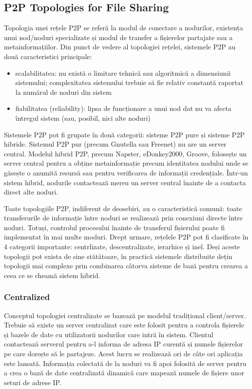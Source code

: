 \subsection{P2P Topologies for File Sharing}

Topologia unei rețele P2P se referă la modul de conectare a nodurilor,
existența unui nod/noduri specializate și modul de transfer a fișierelor
partajate sau a metainformațiilor. Din punct de vedere al topologiei rețelei,
sistemele P2P au două caracteristici principale:

\begin{itemize}
  \item scalabilitatea: nu există o limitare tehnică sau algoritmică a
  dimensiunii sistemului; complexitatea sistemului trebuie să fie relativ
  constantă raportat la numărul de noduri din sistem
  \item fiabilitatea (reliability): lipsa de funcționare a unui nod dat nu va
  afecta întregul sistem (sau, posibil, nici alte noduri)
\end{itemize}

Sistemele P2P pot fi grupate în două categorii: sisteme P2P pure și sisteme
P2P hibride. Sistemul P2P pur (precum Gnutella sau Freenet) nu are un server
central. Modelul hibrid P2P, precum Napster, eDonkey2000, Groove, folosește un
server central pentru a obține metainformație precum identitatea nodului unde
se găsește o anumită resursă sau pentru verificarea de informații credențiale.
Într-un sistem hibrid, nodurile contactează mereu un server central înainte de
a contacta direct alte noduri.

Toate topologiile P2P, indiferent de deosebiri, au o caracteristică comună:
toate transferurile de informație între noduri se realizează prin conexiuni
directe între noduri. Totuși, controlul procesului înainte de transferul
fișierului poate fi implementat în mai multe moduri. Drept urmare, rețelele
P2P pot fi clasificate în 4 categorii importante: centrlizate,
descentralizate, ierarhice și inel. Deși aceste topologii pot exista de sine
stătătoare, în practică sistemele distribuite dețin topologii mai complexe
prin combinarea câtorva sisteme de bază pentru crearea a ceea ce se cheamă
sistem hibrid.

\subsubsection{Centralized}

Conceptul topologiei centralizate se bazează pe modelul tradițional
client/server. Trebuie să existe un server centralizat care este folosit
pentru a controla fișierele și bazele de date cu utilizatorii nodurilor care
intră în sistem. Clientul contactează serverul pentru a-l informa de adresa IP
curentă și numele fișierelor pe care dorește să le partajeze. Acest lucru se
realizează ori de câte ori aplicația este lansată. Informația colectată de la
noduri va fi apoi folosită de server pentru a crea o bază de date centralizată
dinamică care mapează numele de fișiere unor seturi de adrese IP.

